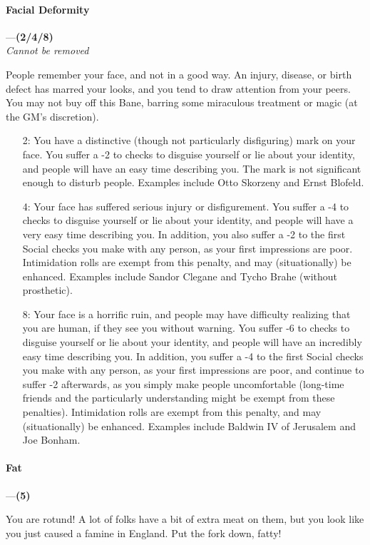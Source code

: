 \documentclass[oneside,11pt,english]{book}
\begin{document}
\paragraph{\label{bane:Facial Deformity}Facial Deformity}---\quad\textbf{(2/4/8) }\\
\textit{Cannot be removed}\par
People remember your face, and not in a good way. An injury, disease, or birth defect has marred your 
looks, and you tend to draw attention from your peers. You may not buy off this Bane, barring some 
miraculous treatment or magic (at the GM's discretion). 
\begin{itemize}
	\item [2:] You have a distinctive (though not particularly disfiguring) mark on your face. You suffer a -2 to checks to disguise yourself or lie about your identity, and people will have an easy time describing you. The mark is not significant enough to disturb people. Examples include Otto Skorzeny and Ernst Blofeld. 
	\item [4:] Your face has suffered serious injury or disfigurement. You suffer a -4 to checks to disguise yourself or lie about your identity, and people will have a very easy time describing you. In addition, you also suffer a -2 to the first Social checks you make with any person, as your first impressions are poor. Intimidation rolls are exempt from this penalty, and may (situationally) be enhanced. Examples include Sandor Clegane and Tycho Brahe (without prosthetic).
	\item [8:] Your face is a horrific ruin, and people may have difficulty realizing that you are human, if they see you without warning. You suffer -6 to checks to disguise yourself or lie about your identity, and people will have an incredibly easy time describing you. In addition, you suffer a -4 to the first Social checks you make with any person, as your first impressions are poor, and continue to suffer -2 afterwards, as you simply make people uncomfortable (long-time friends and the particularly understanding might be exempt from these penalties). Intimidation rolls are exempt from this penalty, and may (situationally) be enhanced. Examples include Baldwin IV of Jerusalem and Joe Bonham.
\end{itemize}
\paragraph{\label{bane:Fat}Fat}---\quad\textbf{(5)}\par
You are rotund! A lot of folks have a bit of extra meat on them, but you look like you just caused a 
famine in England. Put the fork down, fatty! 
\end{document}

